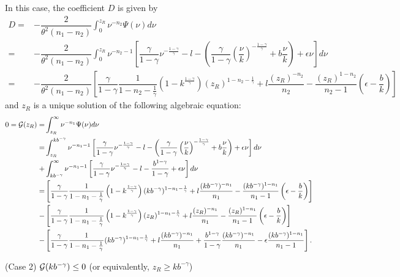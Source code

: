 \documentclass[a4paper,report, 11pt]{article}
\def\e{\epsilon}
\def\g{\gamma}
\def\n{\nu}
\def\t{\theta}
\begin{document}
{\noindent In this case, the coefficient $D$ is given by 
\begin{align*}
D=&-\dfrac{2}{\t^2(n_1-n_2)}\int_0^{z_R}\nu^{-n_2}\Psi(\nu)d\nu\\
 =&-\dfrac{2}{\t^2(n_1-n_2)}\int_0^{z_R}\nu^{-n_2-1}\left[\dfrac{\g}{1-\g}\n^{-\frac{1-\g}{\g}}-l-\left(\dfrac{\g}{1-\g}\left(\dfrac{\n}{k}\right)^{-\frac{1-\g}{\g}}+b\dfrac{\n}{k}\right)+\e\n\right]d\nu\\
 =&-\dfrac{2}{\t^2(n_1-n_2)}\left[\dfrac{\g}{1-\g}\dfrac{1}{1-n_2-\frac{1}{\g}}\left(1-k^{\frac{1-\g}{\g}}\right)(z_R)^{1-n_2-\frac{1}{\g}}+l\dfrac{(z_R)^{-n_2}}{n_2}-\dfrac{(z_R)^{1-n_2}}{n_2-1}\left(\e-\dfrac{b}{k}\right)\right]
\end{align*}
and $z_R$ is a unique solution of the following algebraic equation:
\begin{align*}
0={\cal G}(z_R)=&\int_{z_R}^\infty \nu^{-n_1}\Psi(\nu)d\nu\\
=&\int_{z_R}^{kb^{-\g}}\nu^{-n_1-1}\left[\dfrac{\g}{1-\g}\n^{-\frac{1-\g}{\g}}-l-\left(\dfrac{\g}{1-\g}\left(\dfrac{\n}{k}\right)^{-\frac{1-\g}{\g}}+b\dfrac{\n}{k}\right)+\e\n\right]d\nu\\
+&\int_{kb^{-\g}}^{\infty}\nu^{-n_1-1}\left[\dfrac{\g}{1-\g}\nu^{-\frac{1-\g}{\g}}-l-\dfrac{b^{1-\g}}{1-\g}+\e\nu\right]d\nu\\
=&\left[\dfrac{\g}{1-\g}\dfrac{1}{1-n_1-\frac{1}{\g}}\left(1-k^{\frac{1-\g}{\g}}\right)(kb^{-\g})^{1-n_1-\frac{1}{\g}}+l\dfrac{(kb^{-\g})^{-n_1}}{n_1}-\dfrac{(kb^{-\g})^{1-n_1}}{n_1-1}\left(\e-\dfrac{b}{k}\right)\right]\\
-&\left[\dfrac{\g}{1-\g}\dfrac{1}{1-n_1-\frac{1}{\g}}\left(1-k^{\frac{1-\g}{\g}}\right)(z_R)^{1-n_1-\frac{1}{\g}}+l\dfrac{(z_R)^{-n_1}}{n_1}-\dfrac{(z_R)^{1-n_1}}{n_1-1}\left(\e-\dfrac{b}{k}\right)\right]\\
-&\left[\dfrac{\g}{1-\g}\dfrac{1}{1-n_1-\frac{1}{\g}}(kb^{-\g})^{1-n_1-\frac{1}{\g}}+l\dfrac{(kb^{-\g})^{-n_1}}{n_1}+\dfrac{b^{1-\g}}{1-\g}\dfrac{(kb^{-\g})^{-n_1}}{n_1}-\e\dfrac{(kb^{-\g})^{1-n_1}}{n_1-1}\right].
\end{align*}

\item[(Case 2)] ${\cal G}(kb^{-\g})\le 0$ (or equivalently, $z_R\ge kb^{-\g}$)\\

}
\end{document}
